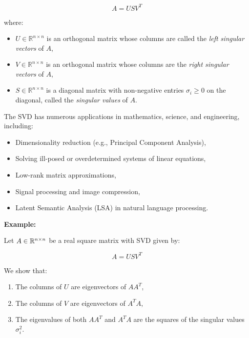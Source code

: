 \[
    A = U S V^T
\]

where:

\begin{itemize}

    \item \( U \in \mathbb{R}^{n \times n} \) is an orthogonal matrix whose columns are called the 
          \emph{left singular vectors} of \( A \),

    \item \( V \in \mathbb{R}^{n \times n} \) is an orthogonal matrix whose columns are the 
          \emph{right singular vectors} of \( A \),

    \item \( S \in \mathbb{R}^{n \times n} \) is a diagonal matrix with non-negative entries 
          \( \sigma_i \geq 0 \) on the diagonal, called the \emph{singular values} of \( A \).

\end{itemize}


The SVD has numerous applications in mathematics, science, and engineering, including:

\begin{itemize}

    \item Dimensionality reduction (e.g., Principal Component Analysis),

    \item Solving ill-posed or overdetermined systems of linear equations,

    \item Low-rank matrix approximations,

    \item Signal processing and image compression,

    \item Latent Semantic Analysis (LSA) in natural language processing.

\end{itemize}

\textbf{Example:}

Let \( A \in \mathbb{R}^{n \times n} \) be a real square matrix with SVD given by:

\[
    A = U S V^T
\]

We show that:

\begin{enumerate}

    \item The columns of \( U \) are eigenvectors of \( AA^T \),

    \item The columns of \( V \) are eigenvectors of \( A^T A \),

    \item The eigenvalues of both \( AA^T \) and \( A^T A \) are the squares of the singular values \( \sigma_i^2 \).

\end{enumerate}

